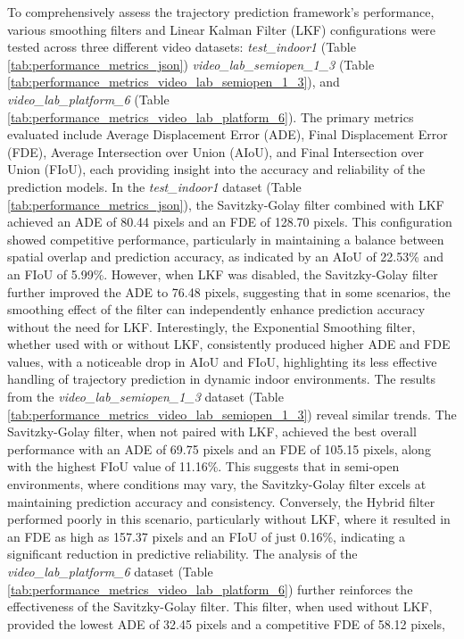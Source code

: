 \documentclass[12pt,oneside]{book} %
\begin{document}
To comprehensively assess the trajectory prediction framework's performance,
various smoothing filters and Linear Kalman Filter (LKF) configurations were
tested across three different video datasets: \textit{test\_indoor1} (Table
\ref{tab:performance_metrics_json}) \textit{video\_lab\_semiopen\_1\_3} (Table
\ref{tab:performance_metrics_video_lab_semiopen_1_3}), and
\textit{video\_lab\_platform\_6} (Table
\ref{tab:performance_metrics_video_lab_platform_6}). The primary metrics
evaluated include Average Displacement Error (ADE), Final Displacement Error
(FDE), Average Intersection over Union (AIoU), and Final Intersection over
Union (FIoU), each providing insight into the accuracy and reliability of the
prediction models. In the \textit{test\_indoor1} dataset (Table
\ref{tab:performance_metrics_json}), the Savitzky-Golay filter combined with
LKF achieved an ADE of 80.44 pixels and an FDE of 128.70 pixels. This
configuration showed competitive performance, particularly in maintaining a
balance between spatial overlap and prediction accuracy, as indicated by an
AIoU of 22.53\% and an FIoU of 5.99\%. However, when LKF was disabled, the
Savitzky-Golay filter further improved the ADE to 76.48 pixels, suggesting that
in some scenarios, the smoothing effect of the filter can independently enhance
prediction accuracy without the need for LKF. Interestingly, the Exponential
Smoothing filter, whether used with or without LKF, consistently produced
higher ADE and FDE values, with a noticeable drop in AIoU and FIoU,
highlighting its less effective handling of trajectory prediction in dynamic
indoor environments. The results from the \textit{video\_lab\_semiopen\_1\_3}
dataset (Table \ref{tab:performance_metrics_video_lab_semiopen_1_3}) reveal
similar trends. The Savitzky-Golay filter, when not paired with LKF, achieved
the best overall performance with an ADE of 69.75 pixels and an FDE of 105.15
pixels, along with the highest FIoU value of 11.16\%. This suggests that in
semi-open environments, where conditions may vary, the Savitzky-Golay filter
excels at maintaining prediction accuracy and consistency. Conversely, the
Hybrid filter performed poorly in this scenario, particularly without LKF,
where it resulted in an FDE as high as 157.37 pixels and an FIoU of just
0.16\%, indicating a significant reduction in predictive reliability. The
analysis of the \textit{video\_lab\_platform\_6} dataset (Table
\ref{tab:performance_metrics_video_lab_platform_6}) further reinforces the
effectiveness of the Savitzky-Golay filter. This filter, when used without LKF,
provided the lowest ADE of 32.45 pixels and a competitive FDE of 58.12 pixels,
\end{document}
